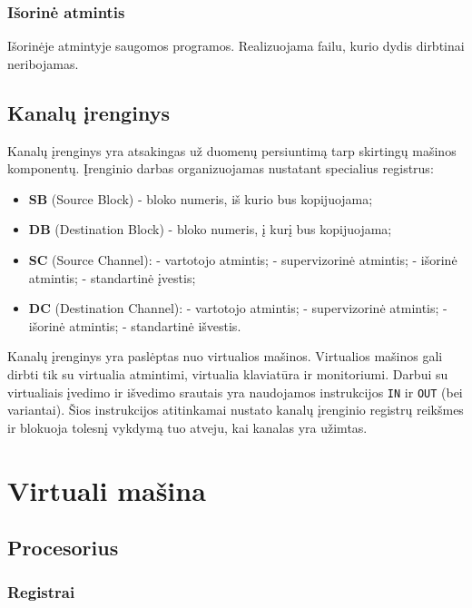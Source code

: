 \documentclass{scrartcl}
\begin{document}
            \subsubsection{Išorinė atmintis}
                Išorinėje atmintyje saugomos programos. Realizuojama failu, kurio dydis dirbtinai neribojamas.
        \subsection{Kanalų įrenginys}
            Kanalų įrenginys yra atsakingas už duomenų persiuntimą tarp skirtingų mašinos komponentų. Įrenginio darbas organizuojamas nustatant specialius registrus:
            \begin{itemize}
                \item \textbf{SB} (Source Block) - bloko numeris, iš kurio bus kopijuojama;
                \item \textbf{DB} (Destination Block) - bloko numeris, į kurį bus kopijuojama;
                \item \textbf{SC} (Source Channel):
                     - vartotojo atmintis;
                     - supervizorinė atmintis;
                     - išorinė atmintis;
                     - standartinė įvestis;
                \item \textbf{DC} (Destination Channel):
                     - vartotojo atmintis;
                     - supervizorinė atmintis;
                     - išorinė atmintis;
                     - standartinė išvestis.
            \end{itemize}
            Kanalų įrenginys yra paslėptas nuo virtualios mašinos. Virtualios mašinos gali dirbti tik su virtualia atmintimi, virtualia klaviatūra ir monitoriumi. Darbui su virtualiais įvedimo ir išvedimo srautais yra naudojamos instrukcijos \texttt{IN} ir \texttt{OUT} (bei variantai). Šios instrukcijos atitinkamai nustato kanalų įrenginio registrų reikšmes ir blokuoja tolesnį vykdymą tuo atveju, kai kanalas yra užimtas.
    \pagebreak
    \section{Virtuali mašina}
        \subsection{Procesorius}
            \subsubsection{Registrai}
\end{document}
